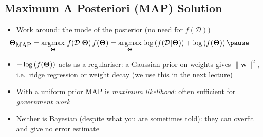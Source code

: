 \begin{slide}
\section[-1]{Maximum A Posteriori (MAP) Solution}

\begin{PauseHighLight}
  \begin{itemize}
  \item Work around: the mode of the posterior (no need for $f(\mathcal{D})$)
    \begin{align*}
       \hspace{-1cm}\bm{\Theta}_{\text{\small MAP}} =
      \argmax_{\bm{\Theta}} \,
       f(\mathcal{D}|\bm{\Theta})\, f(\bm{\Theta})  =
       \argmax_{\bm{\Theta}} \, \logg{f(\mathcal{D}|\bm{\Theta})} +
       \logg{f(\bm{\Theta})}\pause
    \end{align*}
  \item $-\log\left( f(\bm{\Theta}) \right)$ acts as a regulariser: a Gaussian
    prior on weights gives $\|\bm{w}\|^2$, i.e.\ ridge regression or
    weight decay\pause{} (we use this in the next lecture)\pauseb
  \item With a uniform prior MAP is \emph{maximum likelihood}\pause{}:
    often sufficient for \textit{government work}\pauseb
  \item Neither is Bayesian\pause{} (despite what you are sometimes
    told)\pauseb: they can overfit and give no error estimate\pauseb
  \end{itemize}
\end{PauseHighLight}

\end{slide}


